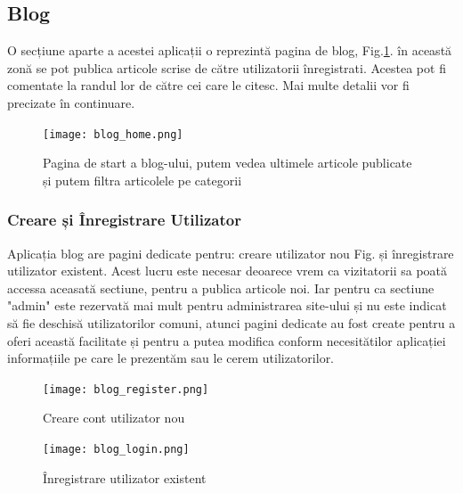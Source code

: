 \documentclass[11pt]{scrartcl} %
\begin{document}



\subsection{Blog}
 
O secțiune aparte a acestei aplicații o reprezintă pagina de blog, Fig.\ref{fig:blog_home}. în această zonă se pot publica articole scrise de către utilizatorii înregistrati. Acestea pot fi comentate la randul lor de către cei care le citesc. Mai multe detalii vor fi precizate în continuare.

\begin{figure}[h] %
	\centering
	\texttt{[image: blog\_home.png]} %
	\caption{Pagina de start a blog-ului, putem vedea ultimele articole publicate și putem filtra articolele pe categorii}
	\label{fig:blog_home}
\end{figure}


\subsubsection{Creare și Înregistrare Utilizator}

Aplicația blog are pagini dedicate pentru: creare utilizator nou Fig. și înregistrare utilizator existent. Acest lucru este necesar deoarece vrem ca vizitatorii sa poată accessa aceasată sectiune, pentru a publica articole noi. Iar pentru ca sectiune "admin" este rezervată mai mult pentru administrarea site-ului și nu este indicat să fie deschisă utilizatorilor comuni, atunci pagini dedicate au fost create pentru a oferi această facilitate și pentru a putea modifica conform necesitătilor aplicației informațiile pe care le prezentăm sau le cerem utilizatorilor. 

\begin{figure}[h] %
	\centering
	\texttt{[image: blog\_register.png]} %
	\caption{Creare cont utilizator nou}
	\label{fig:blog_register}
\end{figure}

\begin{figure}[h] %
	\centering
	\texttt{[image: blog\_login.png]} %
	\caption{Înregistrare utilizator existent}
	\label{fig:blog_login}
\end{figure}
\end{document}
